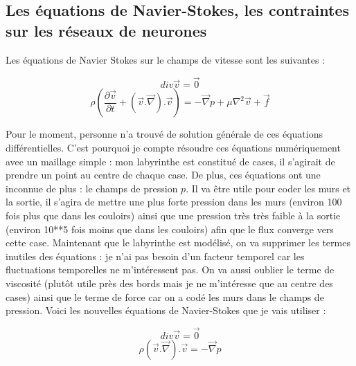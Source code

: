 \documentclass[10pt]{article}
\begin{document}
\subsection{Les équations de Navier-Stokes, les contraintes sur les réseaux de neurones}
Les équations de Navier Stokes sur le champs de vitesse sont les suivantes :

\[div \overrightarrow{v} = \overrightarrow{0}\]
\[\rho(\frac{\partial \overrightarrow{v}}{\partial t} + (\overrightarrow{v}.\overrightarrow{\nabla}). \overrightarrow{v}) = -\overrightarrow{\nabla} p + \mu \nabla^2\overrightarrow{v} +\overrightarrow{f}\]

Pour le moment, personne n'a trouvé de solution générale de ces équations différentielles. C'est pourquoi je compte résoudre ces équations numériquement avec un maillage simple : mon labyrinthe est constitué de cases, il s'agirait de prendre un point au centre de chaque case. De plus, ces équations ont une inconnue de plus : le champs de pression $p$. Il va être utile pour coder les murs et la sortie, il s'agira de mettre une plus forte pression dans les murs (environ 100 fois plus que dans les couloirs) ainsi que une pression très très faible à la sortie (environ 10**5 fois moins que dans les couloirs) afin que le flux converge vers cette case. Maintenant que le labyrinthe est modélisé, on va supprimer les termes inutiles des équations : je n'ai pas besoin d'un facteur temporel car les fluctuations temporelles ne m'intéressent pas. On va aussi oublier le terme de viscosité (plutôt utile près des bords mais je ne m'intéresse que au centre des cases) ainsi que le terme de force car on a codé les murs dans le champs de pression. Voici les nouvelles équations de Navier-Stokes que je vais utiliser :

\[div \overrightarrow{v} = \overrightarrow{0}\]
\[\rho (\overrightarrow{v}.\overrightarrow{\nabla}).\overrightarrow{v}  = -\overrightarrow{\nabla} p \]
\end{document}
